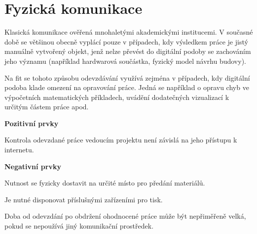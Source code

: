 

\section{Fyzická komunikace}

Klasická komunikace ověřená mnohaletými akademickými institucemi. V současné době se většinou obecně vyplácí pouze v případech, kdy výsledkem práce je jistý manuálně vytvořený objekt, jenž nelze převést do digitální podoby se zachováním jeho významu (například hardwarová součástka, fyzický model návrhu budovy).

Na \gls{fit} se tohoto způsobu odevzdávání využívá zejména v případech, kdy digitální podoba klade omezení na opravování práce. Jedná se například o opravu chyb ve výpočetních matematických příkladech, uvádění dodatečných vizualizací k určitým částem práce apod.

\textbf{Pozitivní prvky}
\begin{ul}
   \item Kontrola odevzdané práce vedoucím projektu není závislá na jeho přístupu k internetu.
\end{ul}

\textbf{Negativní prvky}
\begin{ul}
   \item Nutnost se fyzicky dostavit na určité místo pro předání materiálů.
   \item Je nutné disponovat příslušnými zařízeními pro tisk.
   \item Doba od odevzdání po obdržení ohodnocené práce může být nepřiměřeně velká, pokud se nepoužívá jiný komunikační prostředek.
\end{ul}
